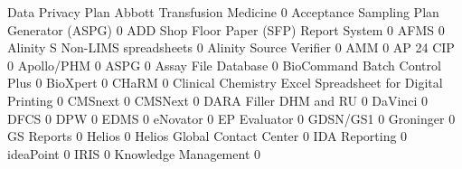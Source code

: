 \documentclass{article}
\begin{document}
\begin{Schunk}
\begin{Soutput}
                                                            Data Privacy Plan
  Abbott Transfusion Medicine                                               0
  Acceptance Sampling Plan Generator (ASPG)                                 0
  ADD Shop Floor Paper (SFP) Report System                                  0
  AFMS                                                                      0
  Alinity S Non-LIMS spreadsheets                                           0
  Alinity Source Verifier                                                   0
  AMM                                                                       0
  AP 24 CIP                                                                 0
  Apollo/PHM                                                                0
  ASPG                                                                      0
  Assay File Database                                                       0
  BioCommand Batch Control Plus                                             0
  BioXpert                                                                  0
  CHaRM                                                                     0
  Clinical Chemistry Excel Spreadsheet for Digital Printing                 0
  CMSnext                                                                   0
  CMSNext                                                                   0
  DARA Filler DHM and RU                                                    0
  DaVinci                                                                   0
  DFCS                                                                      0
  DPW                                                                       0
  EDMS                                                                      0
  eNovator                                                                  0
  EP Evaluator                                                              0
  GDSN/GS1                                                                  0
  Groninger                                                                 0
  GS Reports                                                                0
  Helios                                                                    0
  Helios Global Contact Center                                              0
  IDA Reporting                                                             0
  ideaPoint                                                                 0
  IRIS                                                                      0
  Knowledge Management                                                      0

\end{Soutput}
\end{Schunk}
\end{document}
